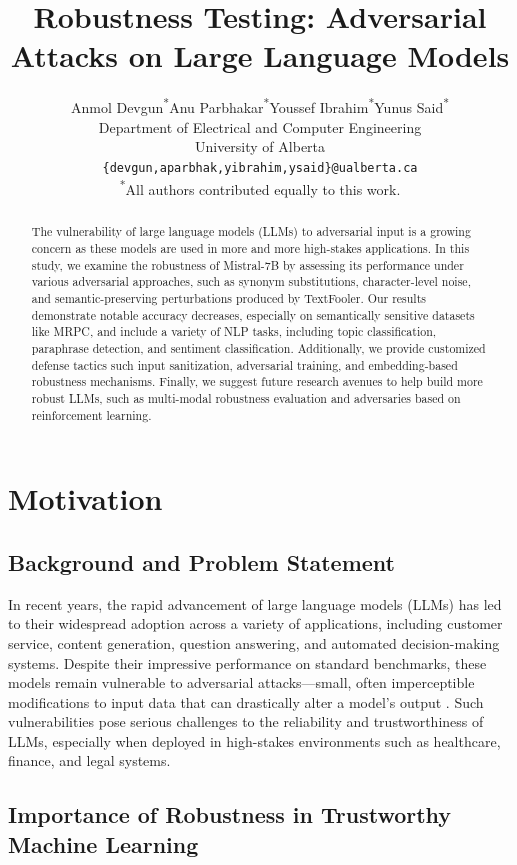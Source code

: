 \documentclass[conference]{IEEEtran}
\title{Robustness Testing: Adversarial Attacks on Large Language Models}
\author{
Anmol Devgun\textsuperscript{*}\quad Anu Parbhakar\textsuperscript{*}\quad Youssef Ibrahim\textsuperscript{*}\quad Yunus Said\textsuperscript{*} \\
Department of Electrical and Computer Engineering \\
University of Alberta \\
\texttt{\{devgun,aparbhak,yibrahim,ysaid\}@ualberta.ca} \\
\textsuperscript{*}All authors contributed equally to this work.
}
\begin{document}
\maketitle

\begin{abstract}
The vulnerability of large language models (LLMs) to adversarial input is a growing concern as these models are used in more and more high-stakes applications.  In this study, we examine the robustness of Mistral-7B by assessing its performance under various adversarial approaches, such as synonym substitutions, character-level noise, and semantic-preserving perturbations produced by TextFooler.  Our results demonstrate notable accuracy decreases, especially on semantically sensitive datasets like MRPC, and include a variety of NLP tasks, including topic classification, paraphrase detection, and sentiment classification.  Additionally, we provide customized defense tactics such input sanitization, adversarial training, and embedding-based robustness mechanisms.  Finally, we suggest future research avenues to help build more robust LLMs, such as multi-modal robustness evaluation and adversaries based on reinforcement learning.
\end{abstract}


\section{Motivation}


\subsection{Background and Problem Statement}

In recent years, the rapid advancement of large language models (LLMs) has led to their widespread adoption across a variety of applications, including customer service, content generation, question answering, and automated decision-making systems. Despite their impressive performance on standard benchmarks, these models remain vulnerable to adversarial attacks—small, often imperceptible modifications to input data that can drastically alter a model's output \cite{vitorino2024}. Such vulnerabilities pose serious challenges to the reliability and trustworthiness of LLMs, especially when deployed in high-stakes environments such as healthcare, finance, and legal systems.

\subsection{Importance of Robustness in Trustworthy Machine Learning}
\end{document}
